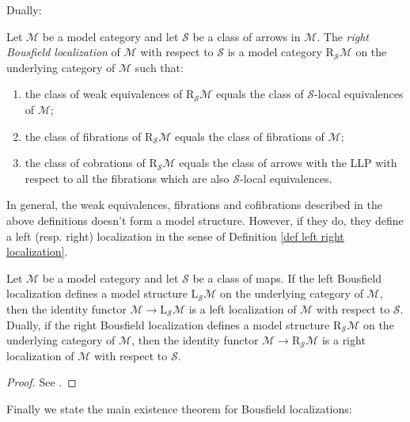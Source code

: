 Dually:

\begin{defin}
Let $\mathcal M$ be a model category and let $\mathcal S$ be a class of arrows in $\mathcal M$. The \emph{right Bousfield localization} of $\mathcal M$ with respect to $\mathcal S$ is a model category $\mathrm R_{\mathcal S} \mathcal M$ on the underlying category of $\mathcal M$ such that:
\begin{enumerate}
\item the class of weak equivalences of $\mathrm R_{\mathcal S} \mathcal M$ equals the class of $\mathcal S$-local equivalences of $\mathcal M$;
\item the class of fibrations of $\mathrm R_{\mathcal S} \mathcal M$ equals the class of fibrations of $\mathcal M$;
\item the class of cobrations of $\mathrm R_{\mathcal S} \mathcal M$ equals the class of arrows with the LLP with respect to all the fibrations which are also $\mathcal S$-local equivalences.
\end{enumerate}
\end{defin}

In general, the weak equivalences, fibrations and cofibrations described in the above definitions doesn't form a model structure. However, if they do, they define a left (resp. right) localization in the sense of Definition \ref{def left right localization}.

\begin{thm}
Let $\mathcal M$ be a model category and let $\mathcal S$ be a class of maps. If the left Bousfield localization defines a model structure $\mathrm L_{\mathcal S} \mathcal M$ on the underlying category of $\mathcal M$, then the identity functor $\mathcal M \to \mathrm L_{\mathcal S} \mathcal M$ is a left localization of $\mathcal M$ with respect to $\mathcal S$. Dually, if the right Bousfield localization defines a model structure $\mathrm R_{\mathcal S} \mathcal M$ on the underlying category of $\mathcal M$, then the identity functor $\mathcal M \to \mathrm R_{\mathcal S} \mathcal M$ is a right localization of $\mathcal M$ with respect to $\mathcal S$.
\end{thm}

\begin{proof}
See \cite[Theorem 3.3.19]{hirschhorn}.
\end{proof}

Finally we state the main existence theorem for Bousfield localizations:

